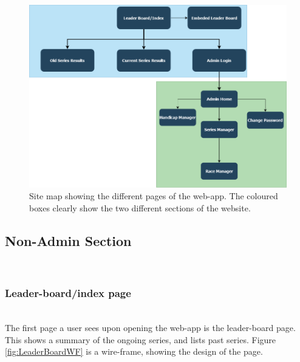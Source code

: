 \documentclass{l4proj}
\begin{document}
\begin{figure}[H]
    \centering
    \includegraphics[width=1\linewidth]{images/SiteMap.png} 

    \caption{Site map showing the different pages of the web-app. The coloured boxes clearly show the two different sections of the website.
    }

    \label{fig:Site Map}
\end{figure}

\subsection{Non-Admin Section}

\hfill\\
\subsubsection{Leader-board/index page}
\hfill\\
The first page a user sees upon opening the web-app is the leader-board page. This shows a summary of the ongoing series, and lists past series. Figure \ref{fig:LeaderBoardWF} is a wire-frame, showing the design of the page.
\end{document}
